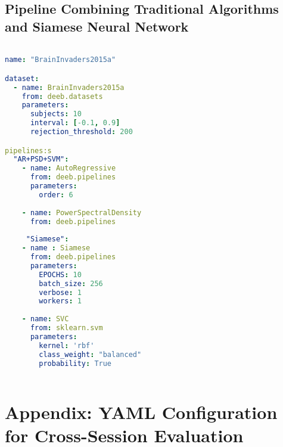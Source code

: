 \subsection{Pipeline Combining Traditional Algorithms and Siamese Neural Network}
\begin{lstlisting}[language=YAML, style=customyaml, caption={Benchamrking pipeline for dataset BrainInvaders15a with traditional and deep learning methods}, label={lst:yaml}]

name: "BrainInvaders2015a"

dataset: 
  - name: BrainInvaders2015a
    from: deeb.datasets
    parameters: 
      subjects: 10
      interval: [-0.1, 0.9]
      rejection_threshold: 200

pipelines:s
  "AR+PSD+SVM": 
    - name: AutoRegressive
      from: deeb.pipelines
      parameters: 
        order: 6
        
    - name: PowerSpectralDensity
      from: deeb.pipelines
      
     "Siamese": 
    - name : Siamese
      from: deeb.pipelines
      parameters: 
        EPOCHS: 10
        batch_size: 256
        verbose: 1
        workers: 1
        
    - name: SVC
      from: sklearn.svm
      parameters: 
        kernel: 'rbf'
        class_weight: "balanced"
        probability: True
        
\end{lstlisting}

\section{Appendix: YAML Configuration for Cross-Session Evaluation}
\label{sec:Appendix:Cross-Session}

